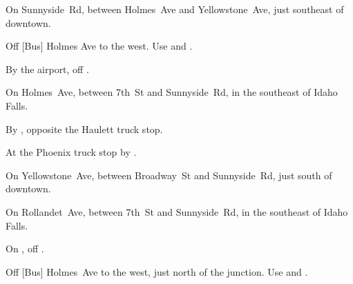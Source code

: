 
\begin{LocationList}

On Sunnyside~Rd, between Holmes~Ave and Yellowstone~Ave, just southeast of downtown.

\Location{\GarageHQ \Garage \SpecialTransport}
Off [Bus] Holmes Ave to the west.
Use   and  .

By the airport, off  .

On Holmes~Ave, between 7th~St and Sunnyside~Rd, in the southeast of Idaho Falls.

By  , opposite the Haulett truck stop.

At the Phoenix truck stop by  .

On Yellowstone~Ave, between Broadway~St and Sunnyside~Rd, just south of downtown.

On Rollandet~Ave, between 7th~St and Sunnyside~Rd, in the southeast of Idaho Falls.

\Location{\RecruitmentAgency \Recruitment}
On , off  .


Off [Bus] Holmes~Ave to the west, just north of the  junction.
Use   and  .

\end{LocationList}
